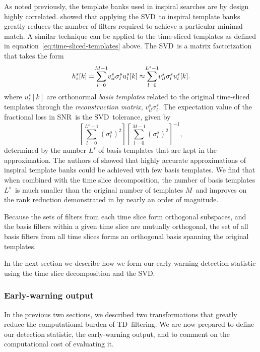 \documentclass[preprint2]{aastex}
\newcommand{\SNR}{SNR}%
\newcommand{\numtmps}{\ensuremath{M}}
\newcommand{\SVD}{SVD}%
\newcommand{\svdtmps}[1]{\ensuremath{L^#1}}
\newcommand{\numsvdtmps}{\svdtmps{s}}
\newcommand{\TD}{TD}%
\def\clap#1{\hbox to 0pt{\hss#1\hss}}
\def\mathclap{\mathpalette\mathclapinternal}
\def\mathclapinternal#1#2{\clap{$\mathsurround=0pt#1{#2}$}}
\begin{document}
As noted previously, the template banks used in inspiral searches are by design
highly correlated.  \citet{Cannon:2010p10398} showed that applying the \SVD\
to inspiral template banks greatly reduces the number of filters required to achieve a
particular minimal match.  A similar technique can be applied to the time-sliced
templates as defined in equation~\ref{eq:time-sliced-templates} above.  The \SVD\
is a matrix factorization that takes the form
%
\begin{equation}
h_i^s[k] = \sum_{\mathclap{l=0}}^{\mathclap{M-1}} v_{il}^s \sigma_l^s u_l^s[k] \approx \sum_{\mathclap{l=0}}^{\mathclap{L^s-1}} v_{il}^s \sigma_l^s u_l^s[k].
\label{eq:svddecomp}
\end{equation}
where $u_l^s[k]$ are orthonormal \emph{basis templates} related to the original
time-sliced templates through the \emph{reconstruction matrix}, $v_{il}^s\sigma_l^s$.
The expectation value of the fractional loss in \SNR\ is the \SVD\ tolerance, given by
%
\begin{equation*}
\left[ \sum_{l=0}^{L^s-1} \left( \sigma_l^s \right)^2 \right]\left[ \sum_{l=0}^{M-1} \left( \sigma_l^s \right)^2 \right]^{-1},
\end{equation*}
%
determined by the number $\numsvdtmps$ of basis templates that are kept in
the approximation.  The authors of \citet{Cannon:2010p10398}
showed that highly accurate approximations of inspiral template banks could be
achieved with few basis templates.  We find that when combined with the
time slice decomposition, the number of basis templates \numsvdtmps\ is much
smaller than the original number of templates \numtmps\ and improves on the
rank reduction demonstrated in \citep{Cannon:2010p10398} by nearly an order
of magnitude.

Because the sets of filters from each time slice form orthogonal subspaces, and
the basis filters within a given time slice are mutually orthogonal, the set of
all basis filters from all time slices forms an orthogonal basis spanning the
original templates.

In the next section we describe how we form our early-warning detection
statistic using the time slice decomposition and the \SVD.

\subsubsection{Early-warning output}

In the previous two sections, we described two transformations that greatly
reduce the computational burden of \TD\ filtering.  We are now prepared to
define our detection statistic, the early-warning output, and to comment on the
computational cost of evaluating it.
\end{document}
